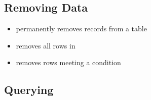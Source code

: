 \documentclass[a4paper]{article}
\begin{document}
\subsection{Removing Data}
\begin{itemize}
    \item {} permanently removes records from a table
    \item {} removes all rows in 
    \item {} removes rows meeting a condition
\end{itemize}

\subsection{Querying}
\end{document}
